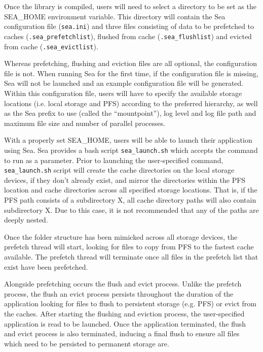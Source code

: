 Once the library is compiled, users will need to select a directory to be set as
the SEA\_HOME environment variable. This directory will contain the Sea
configuration file (\texttt{sea.ini}) and three files consisting of data to be
prefetched to caches (\texttt{.sea\_prefetchlist}), flushed from cache
(\texttt{.sea\_flushlist}) and evicted from cache (\texttt{.sea\_evictlist}).

Whereas prefetching, flushing and eviction files are all optional, the
configuration file is not. When running Sea for the first time, if the
configuration file is missing, Sea will not be launched and an example
configuration file will be generated. Within this configuration file, users will
have to specify the available storage locations (i.e. local storage and PFS) according to 
the preferred hierarchy, as
well as the Sea prefix to use (called the ``mountpoint''), log level and log
file path and maximum file size and number of parallel processes.

With a properly set SEA\_HOME, users will be able to launch their application
using Sea. Sea provides a bash script \texttt{sea\_launch.sh} which accepts the
command to run as a parameter. Prior to launching the user-specified command,
\texttt{sea\_launch.sh} script will create the cache directories on the local
storage devices, if they don't already exist, and mirror the directories within
the PFS location and cache directories across all specified storage locations.
That is, if the PFS path consists of a subdirectory X, all cache directory paths
will also contain subdirectory X. Due to this case, it is not recommended that
any of the paths are deeply nested.

Once the folder structure has been mimicked across all storage devices, the
prefetch thread will start, looking for files to copy from PFS to the fastest
cache available. The prefetch thread will terminate once all files in the
prefetch list that exist have been prefetched.

Alongside prefetching occurs the flush and evict process. Unlike the prefetch
process, the flush an evict process persists throughout the duration of the
application looking for files to flush to persistent storage (e.g. PFS) or evict
from the caches. After starting the flushing and eviction process, the
user-specified application is read to be launched. Once the application
terminated, the flush and evict process is also terminated, inducing a final
flush to ensure all files which need to be persisted to permanent storage are.


